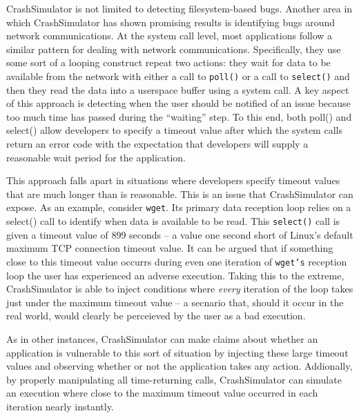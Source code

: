             CrashSimulator is not limited to detecting filesystem-based bugs.  Another area in which CrashSimulator has
            shown promising results is identifying bugs around network communications.  At the system call level, most
            applications follow a similar pattern for dealing with network communications.  Specifically, they use some
            sort of a looping construct repeat two actions: they wait for data to be available from the network with
            either a call to {\tt poll()} or a call to {\tt select()} and then they read the data into a userspace
            buffer using a system call.  A key aspect of this approach is detecting when the user should be notified of
            an issue because too much time has passed during the ``waiting'' step.  To this end, both poll() and
            select() allow developers to specify a timeout value after which the system calls return an error code with
            the expectation that developers will supply a reasonable wait period for the application.

            This approach falls apart in situations where developers specify timeout values that are much longer than is
            reasonable.  This is an issue that CrashSimulator can expose.  As an example, consider {\tt wget}.  Its
            primary data reception loop relies on a select() call to identify when data is available to be read.  This
            {\tt select()} call is given a timeout value of 899 seconds -- a value one second short of Linux's default
            maximum TCP connection timeout value.  It can be argued that if something close to this timeout value
            occurrs during even one iteration of {\tt wget's} reception loop the user has experienced an adverse
            execution.  Taking this to the extreme, CrashSimulator is able to inject conditions where \emph{every}
            iteration of the loop takes just under the maximum timeout value -- a secnario that, should it occur in the
            real world, would clearly be perceieved by the user as a bad execution.

            As in other instances, CrashSimulator can make claims about whether an application is vulnerable to this
            sort of situation by injecting these large timeout values and observing whether or not the application takes
            any action.  Addionally, by properly manipulating all time-returning calls, CrashSimulator can simulate an
            execution where close to the maximum timeout value occurred in each iteration nearly instantly.

